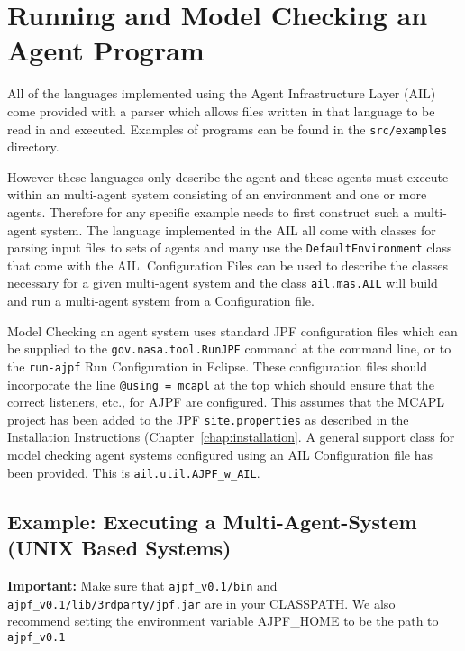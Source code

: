 \chapter{Running and Model Checking an Agent Program}
\label{chap:running}

All of the languages implemented using the Agent Infrastructure Layer (AIL) come provided with a parser which allows files written in that language to be read in and executed.  Examples of programs can be found in the \texttt{src/examples} directory.

However these languages only describe the agent and these agents must execute within an multi-agent system consisting of an environment and one or more agents.  Therefore for any specific example needs to first construct such a multi-agent system.  The language implemented in the AIL all come with classes for parsing input files to sets of agents and many use the \texttt{DefaultEnvironment} class that come with the AIL. Configuration Files can be used to describe the classes necessary  for a given multi-agent system and the class \texttt{ail.mas.AIL} will build and run a multi-agent system from a Configuration file.

Model Checking an agent system uses standard JPF configuration files which can be supplied to the \texttt{gov.nasa.tool.RunJPF} command at the command line, or to the \texttt{run-ajpf} Run Configuration in Eclipse.  These configuration files should incorporate the line \texttt{@using = mcapl} at the top which should ensure that the correct listeners, etc., for AJPF are configured.  This assumes that the MCAPL project has been added to the JPF \texttt{site.properties} as described in the Installation Instructions (Chapter~\ref{chap:installation}.  A general support class for model checking agent systems configured using an AIL Configuration file has been provided.  This is \texttt{ail.util.AJPF\_w\_AIL}. 

\section{Example: Executing a Multi-Agent-System (UNIX Based Systems)}
{\bf Important:} Make sure that \texttt{ajpf\_v0.1/bin} and \texttt{ajpf\_v0.1/lib/3rdparty/jpf.jar} are in your CLASSPATH.  We also recommend setting the environment variable AJPF\_HOME to be the path to \texttt{ajpf\_v0.1}

